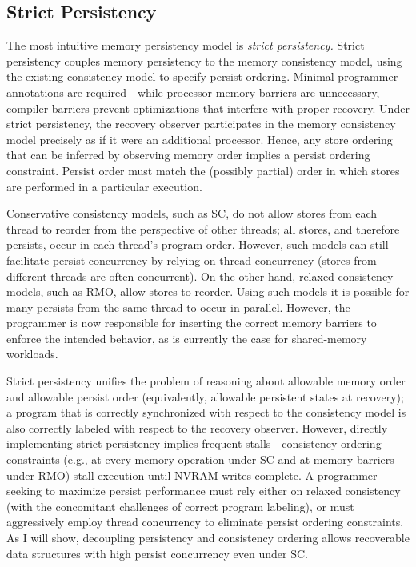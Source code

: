 \subsection{Strict Persistency}

The most intuitive memory persistency model is \emph{strict persistency.}
Strict persistency couples memory persistency to the memory consistency model, using the existing consistency model to specify persist ordering.
Minimal programmer annotations are required---while processor memory barriers are unnecessary, compiler barriers prevent optimizations that interfere with proper recovery.
Under strict persistency, the recovery observer participates in the memory consistency model precisely as if it were an additional processor.  
Hence, any store ordering that can be inferred by observing memory order implies a persist ordering constraint.
Persist order must match the (possibly partial) order in which stores are performed in a particular execution.
 
Conservative consistency models, such as SC, do not allow stores from each thread to reorder from the perspective of other threads; all stores, and therefore persists, occur in each thread's program order.
However, such models can still facilitate persist concurrency by relying on thread concurrency (stores from different threads are often concurrent).
On the other hand, relaxed consistency models, such as RMO, allow stores to reorder.
Using such models it is possible for many persists from the same thread to occur in parallel.
However, the programmer is now responsible for inserting the correct memory barriers to enforce the intended behavior, as is currently the case for shared-memory workloads.

Strict persistency unifies the problem of reasoning about allowable memory order and allowable persist order (equivalently, allowable persistent states at recovery); a program that is correctly synchronized with respect to the consistency model is also correctly labeled with respect to the recovery observer.
However, directly implementing strict persistency implies frequent stalls---consistency ordering constraints (e.g., at every memory operation under SC and at memory barriers under RMO) stall execution until NVRAM writes complete. 
A programmer seeking to maximize persist performance must rely either on relaxed consistency (with the concomitant challenges of correct program labeling), or must aggressively employ thread concurrency to eliminate persist ordering constraints.
As I will show, decoupling persistency and consistency ordering allows recoverable data structures with high persist concurrency even under SC.

